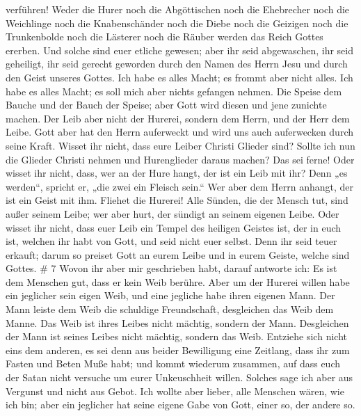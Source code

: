 verführen! Weder die Hurer noch die Abgöttischen noch die Ehebrecher
noch die Weichlinge noch die Knabenschänder  noch die Diebe
noch die Geizigen noch die Trunkenbolde noch die Lästerer noch die
Räuber werden das Reich Gottes ererben.  Und solche sind
euer etliche gewesen; aber ihr seid abgewaschen, ihr seid geheiligt, ihr
seid gerecht geworden durch den Namen des Herrn Jesu und durch den Geist
unseres Gottes.  Ich habe es alles Macht; es frommt aber
nicht alles. Ich habe es alles Macht; es soll mich aber nichts gefangen
nehmen.  Die Speise dem Bauche und der Bauch der Speise;
aber Gott wird diesen und jene zunichte machen. Der Leib aber nicht der
Hurerei, sondern dem Herrn, und der Herr dem Leibe.  Gott
aber hat den Herrn auferweckt und wird uns auch auferwecken durch seine
Kraft.  Wisset ihr nicht, dass eure Leiber Christi Glieder
sind? Sollte ich nun die Glieder Christi nehmen und Hurenglieder daraus
machen? Das sei ferne!  Oder wisset ihr nicht, dass, wer an
der Hure hangt, der ist ein Leib mit ihr? Denn „es werden``, spricht er,
„die zwei ein Fleisch sein.``  Wer aber dem Herrn anhangt,
der ist ein Geist mit ihm.  Fliehet die Hurerei! Alle
Sünden, die der Mensch tut, sind außer seinem Leibe; wer aber hurt, der
sündigt an seinem eigenen Leibe.  Oder wisset ihr nicht,
dass euer Leib ein Tempel des heiligen Geistes ist, der in euch ist,
welchen ihr habt von Gott, und seid nicht euer selbst. 
Denn ihr seid teuer erkauft; darum so preiset Gott an eurem Leibe und in
eurem Geiste, welche sind Gottes. \# 7  Wovon ihr aber mir
geschrieben habt, darauf antworte ich: Es ist dem Menschen gut, dass er
kein Weib berühre.  Aber um der Hurerei willen habe ein
jeglicher sein eigen Weib, und eine jegliche habe ihren eigenen Mann.
 Der Mann leiste dem Weib die schuldige Freundschaft,
desgleichen das Weib dem Manne.  Das Weib ist ihres Leibes
nicht mächtig, sondern der Mann. Desgleichen der Mann ist seines Leibes
nicht mächtig, sondern das Weib.  Entziehe sich nicht eins
dem anderen, es sei denn aus beider Bewilligung eine Zeitlang, dass ihr
zum Fasten und Beten Muße habt; und kommt wiederum zusammen, auf dass
euch der Satan nicht versuche um eurer Unkeuschheit willen. 
Solches sage ich aber aus Vergunst und nicht aus Gebot.  Ich
wollte aber lieber, alle Menschen wären, wie ich bin; aber ein jeglicher
hat seine eigene Gabe von Gott, einer so, der andere so. 
